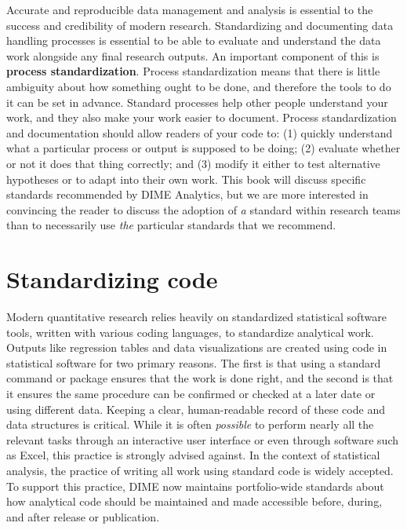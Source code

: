 {Accurate and reproducible data management and analysis
is essential to the success and credibility of modern research.
Standardizing and documenting data handling processes is essential
to be able to evaluate and understand
the data work alongside any final research outputs.
An important component of this is \textbf{process standardization}.
Process standardization means that there is
little ambiguity about how something ought to be done,
and therefore the tools to do it can be set in advance.
Standard processes help other people understand your work,
and they also make your work easier to document.
Process standardization and documentation should allow readers of your code to:
(1) quickly understand what a particular process or output is supposed to be doing;
(2) evaluate whether or not it does that thing correctly; and
(3) modify it either to test alternative hypotheses or to adapt into their own work.
This book will discuss specific standards recommended by DIME Analytics,
but we are more interested in convincing the reader
to discuss the adoption of \textit{a} standard within research teams
than to necessarily use \textit{the} particular standards that we recommend.


\section{Standardizing code}

Modern quantitative research relies heavily
on standardized statistical software tools,
written with various coding languages, to standardize analytical work.
Outputs like regression tables and data visualizations
are created using code in statistical software for two primary reasons.
The first is that using a standard command or package ensures that the work is done right,
and the second is that it ensures the same procedure can be confirmed or checked
at a later date or using different data.
Keeping a clear, human-readable record of these code and data structures is critical.
While it is often \textit{possible} to perform nearly all the relevant tasks
through an interactive user interface or even through software such as Excel,
this practice is strongly advised against.
In the context of statistical analysis,
the practice of writing all work using standard code is widely accepted.
To support this practice, DIME now maintains portfolio-wide standards
about how analytical code should be maintained and made accessible
before, during, and after release or publication.

}
